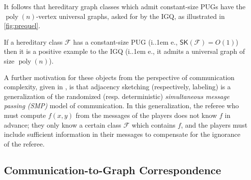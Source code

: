\documentclass{theoretics}
\makeatletter
\DeclareMathOperator{\poly}{poly}
\newcommand{\cF}{\ensuremath{\mathcal{F}}}
\newcommand*\ie{i.\kern.1em e.\@\xspace} %
\newcommand{\RL}{\mathsf{SK}}
\makeatother
\begin{document}
It follows that hereditary graph classes which admit constant-size PUGs have the $\poly(n)$-vertex
universal graphs, asked for by the IGQ, as illustrated in \cref{fig:prequel}. 

\begin{proposition}
\label{prop:correspondence inclusion}
If a hereditary class $\cF$ has a constant-size PUG (\ie, $\RL(\cF)=O(1)$) then it is a positive example to the IGQ
(\ie, it admits a universal graph of size $\poly(n)$).
\end{proposition}

\begin{remark}
A further motivation for these objects from the perspective of communication complexity, given in
\cite{Har20}, is that adjacency sketching (respectively, labeling) is a generalization of the
randomized (resp. deterministic) \emph{simultaneous message passing (SMP)} model of communication.
In this generalization, the referee who must compute $f(x,y)$ from the messages of the players does
not know $f$ in advance; they only know a certain class $\cF$ which contains $f$, and the players
must include sufficient information in their messages to compensate for the ignorance of the
referee. 
\end{remark}

\subsection{Communication-to-Graph Correspondence}
\label{section:correspondence}
\end{document}
